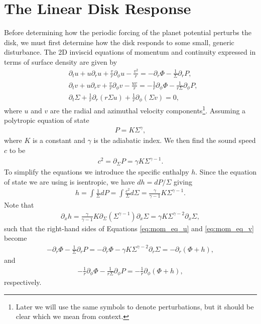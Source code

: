 \section{The Linear Disk Response}

Before determining how the periodic forcing of the planet potential perturbs the disk, we must first determine how the disk responds to some small, generic disturbance.
The 2D inviscid equations of momentum and continuity expressed in terms of surface density are given by \citep{landau1987}
\begin{align}
    &\partial_t u + u \partial_r u + \frac{v}{r} \partial_\phi u - \frac{v^2}{r} = - \partial_r \Phi - \frac{1}{\Sigma} \partial_r P, \label{eq:mom_eq_u} \\ 
    &\partial_t v + u \partial_r v + \frac{v}{r} \partial_\phi v - \frac{uv}{r} = - \frac{1}{r} \partial_\phi \Phi - \frac{1}{r\Sigma} \partial_\phi P, \label{eq:mom_eq_v} \\
    &\partial_t \Sigma + \frac{1}{r} \partial_r (r \Sigma u) + \frac{1}{r} \partial_\phi (\Sigma v) = 0,
    \label{eq:cont_2d}
\end{align}
where $u$ and $v$ are the radial and azimuthal velocity components\footnote{Later we will use the same symbols to denote perturbations, but it should be clear which we mean from context.}.
Assuming a polytropic equation of state
\begin{align}
    P = K \Sigma^\gamma,
\end{align}
where $K$ is a constant and $\gamma$ is the adiabatic index. We then find the sound speed $c$ to be
\begin{align}
    c^2 = \partial_\Sigma P = \gamma K \Sigma^{\gamma-1}. \label{eq:cs_poly}
\end{align}
To simplify the equations we introduce the specific enthalpy $h$. Since the equation of state we are using is isentropic, we have $dh = dP / \Sigma$ giving
\begin{align}
    h = \int \frac{1}{\Sigma} dP = \int \frac{c^2}{\Sigma} d\Sigma = \frac{\gamma}{\gamma-1} K \Sigma^{\gamma-1}. \label{eq:enthalpy}
\end{align}
Note that
\begin{align}
    \partial_x h = \frac{\gamma}{\gamma - 1} K \partial_\Sigma (\Sigma^{\gamma-1}) \partial_x \Sigma = \gamma K \Sigma^{\gamma-2} \partial_x \Sigma,
\end{align}
such that the right-hand sides of Equations \eqref{eq:mom_eq_u} and \eqref{eq:mom_eq_v} become
\begin{align}
    - \partial_r \Phi - \frac{1}{\Sigma} \partial_r P = - \partial_r \Phi - \gamma K \Sigma^{\gamma-2} \partial_r \Sigma = - \partial_r (\Phi + h) \label{eq:mom_u_RHS},
\end{align}
and
\begin{align}
    - \frac{1}{r} \partial_\phi \Phi - \frac{1}{r\Sigma} \partial_\phi P = - \frac{1}{r} \partial_\phi (\Phi + h) \label{eq:mom_v_RHS},
\end{align}
respectively.

